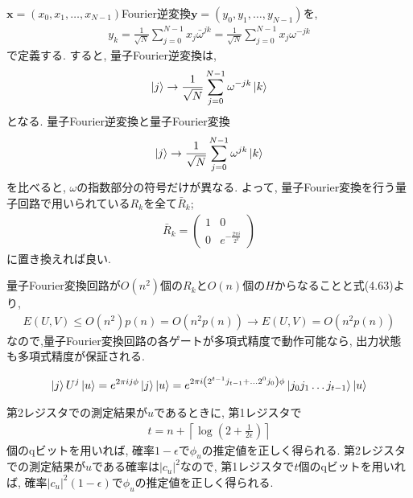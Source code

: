 \begin{ex}
    \label{ex5.5}
    $\bm{x} = (x_0, x_1, \dots , x_{N-1})$Fourier逆変換$\bm{y} = (y_0, y_1, \dots, y_{N-1})$を,
    \begin{align*}
        y_k
        = \frac{1}{\sqrt{N}} \sum_{j=0}^{N-1} x_j \bar{\omega}^{jk}
        =\frac{1}{\sqrt{N}} \sum_{j=0}^{N-1} x_j {\omega}^{-jk}
    \end{align*}
    で定義する. すると, 量子Fourier逆変換は,
    \begin{align*}
        \ket{j}
        \to
        \frac{1}{\sqrt{N}} \sum_{j=0}^{N-1}  {\omega}^{-jk} \ket{k}
    \end{align*}
    となる. 量子Fourier逆変換と量子Fourier変換
    \begin{align*}
        \ket{j}
        \to
        \frac{1}{\sqrt{N}} \sum_{j=0}^{N-1}  {\omega}^{jk} \ket{k}
    \end{align*}
    を比べると, $\omega$の指数部分の符号だけが異なる. よって, 量子Fourier変換を行う量子回路で用いられている$R_k$を全て$\bar{R}_k$;
    \begin{align*}
        \bar{R}_k = \begin{pmatrix}
            1 & 0                         \\
            0 & e^{- \frac{2 \pi i}{2^k}}
        \end{pmatrix}
    \end{align*}
    に置き換えれば良い.
\end{ex}


\begin{ex}
    \label{ex5.6}
    量子Fourier変換回路が$O(n^2)$個の$R_k$と$O(n)$個の$H$からなることと式(4.63)より,
    \begin{align*}
        E(U,V) \leq O(n^2) p(n) = O(n^2 p(n)) \to E(U,V) = O(n^2p(n))
    \end{align*}
    なので,量子Fourier変換回路の各ゲートが多項式精度で動作可能なら, 出力状態も多項式精度が保証される.
\end{ex}


\begin{ex}
    \label{ex5.7}
    \begin{align*}
        \ket{j} U^j \ket{u}
        =
        e^{2 \pi i j \phi}\ket{j} \ket{u}
        =
        e^{2 \pi i \left( 2^{t-1}j_{t-1} + \dots 2^0 j_{0} \right) \phi}
        \ket{j_0 j_1 \dots j_{t-1}} \ket{u}
    \end{align*}
\end{ex}

\begin{ex}
    \label{ex5.8}
    第2レジスタでの測定結果が$u$であるときに, 第1レジスタで
    \begin{align*}
        t = n + \left\lceil \log\left( 2 + \frac{1}{2 \epsilon}\right) \right\rceil
    \end{align*}
    個のqビットを用いれば, 確率$1-\epsilon$で$\phi_u$の推定値を正しく得られる.
    第2レジスタでの測定結果が$u$である確率は$|c_u|^2$なので, 第1レジスタで$t$個のqビットを用いれば, 確率$|c_u|^2(1-\epsilon)$で$\phi_u$の推定値を正しく得られる.
\end{ex}


